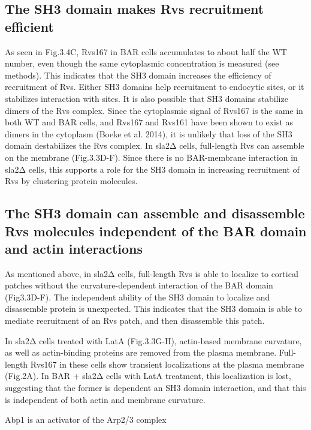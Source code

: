 \subsection{The SH3 domain makes Rvs recruitment efficient} 
As seen in Fig.3.4C, Rvs167 in BAR cells accumulates to about half the WT number, even though the same cytoplasmic concentration is measured (see methods). This indicates that the SH3 domain increases the efficiency of recruitment of Rvs. Either SH3 domains help recruitment to endocytic sites, or it stabilizes interaction with sites. It is also possible that SH3 domains stabilize dimers of the Rvs complex. Since the cytoplasmic signal of Rvs167 is the same in both WT and BAR cells, and Rvs167 and Rvs161 have been shown to exist as dimers in the cytoplasm (Boeke et al. 2014), it is unlikely that loss of the SH3 domain destabilizes the Rvs complex. In sla2Δ cells, full-length Rvs can assemble on the membrane (Fig.3.3D-F). Since there is no BAR-membrane interaction in sla2Δ cells, this supports a role for the SH3 domain in increasing recruitment of Rvs by clustering protein molecules. 


	\subsection{The SH3 domain can assemble and disassemble Rvs molecules independent of the BAR domain and actin interactions} 
As mentioned above, in sla2Δ cells, full-length Rvs is able to localize to cortical patches without the curvature-dependent interaction of the BAR domain (Fig3.3D-F). The independent ability of the SH3 domain to localize and disassemble protein is unexpected. This indicates that the SH3 domain is able to mediate recruitment of an Rvs patch, and then disassemble this patch. 

In sla2Δ cells treated with LatA (Fig.3.3G-H), actin-based membrane curvature, as well as actin-binding proteins are removed from the plasma membrane. Full-length Rvs167 in these cells show transient localizations at the plasma membrane (Fig.2A). In BAR + sla2Δ cells with LatA treatment, this localization is lost, suggesting that the former is dependent an SH3 domain interaction, and that this is independent of both actin and membrane curvature. 

Abp1 is an activator of the Arp2/3 complex 

